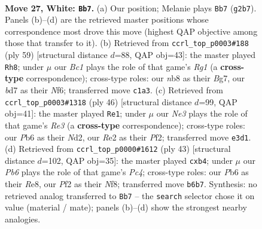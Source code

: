 \documentclass[11pt]{article}
\begin{document}
\clearpage

\begin{figure}[p]\centering
\begin{subfigure}{0.46\textwidth}\centering
\resizebox{\linewidth}{!}{%
\newchessgame
\chessboard[
  setfen={1n3r1k/3b2b1/rP3n2/p3p3/P1P3p1/4N1P1/3NRPB1/1RB3K1 w - - 1 27},
  showmover=false,
  pgfstyle=straightmove, color=movearrow, markmove={g2-b7}
]}
\caption{}
\end{subfigure}\hfill
\begin{subfigure}{0.46\textwidth}\centering
\resizebox{\linewidth}{!}{%
\newchessgame
\chessboard[
  setfen={6r1/1kp1r1b1/1p3n2/3Pn1p1/1PP3p1/4P3/1BK1B3/2N3RR b - - 0 30},
  showmover=false,
  pgfstyle=straightmove, color=movearrow, markmove={g8-h8}
]}
\caption{}
\end{subfigure}
\\[4pt]
\begin{subfigure}{0.46\textwidth}\centering
\resizebox{\linewidth}{!}{%
\newchessgame
\chessboard[
  setfen={4rbk1/1R2np2/4b1pp/p2r4/8/P3RNP1/1P1N1PBP/6K1 w - - 1 24},
  showmover=false,
  pgfstyle=straightmove, color=movearrow, markmove={e3-e1}
]}
\caption{}
\end{subfigure}\hfill
\begin{subfigure}{0.46\textwidth}\centering
\resizebox{\linewidth}{!}{%
\newchessgame
\chessboard[
  setfen={r3rnk1/pp1b2p1/1n3p2/2p4P/1P1p1N2/5N2/P1PB1PP1/2K1R2R b - - 0 22},
  showmover=false,
  pgfstyle=straightmove, color=movearrow, markmove={c5-b4}
]}
\caption{}
\end{subfigure}
\caption{\textbf{Move 27, White: \texttt{Bb7}.} (a) Our position; Melanie plays \texttt{Bb7} (\texttt{g2b7}). Panels (b)--(d) are the retrieved master positions whose correspondence most drove this move (highest QAP objective among those that transfer to it). (b) Retrieved from \texttt{ccrl\_top\_p0003\#188} (ply 59) [structural distance $d$=88, QAP obj=43]: the master played \texttt{Rh8}; under $\mu$ our \emph{Bc1} plays the role of that game's \emph{Rg1} (a \textbf{cross-type} correspondence); cross-type roles: our \emph{n}b8 as their \emph{B}g7, our \emph{b}d7 as their \emph{N}f6; transferred move \texttt{c1a3}. (c) Retrieved from \texttt{ccrl\_top\_p0003\#1318} (ply 46) [structural distance $d$=99, QAP obj=41]: the master played \texttt{Re1}; under $\mu$ our \emph{Ne3} plays the role of that game's \emph{Re3} (a \textbf{cross-type} correspondence); cross-type roles: our \emph{P}b6 as their \emph{N}d2, our \emph{R}e2 as their \emph{P}f2; transferred move \texttt{e3d1}. (d) Retrieved from \texttt{ccrl\_top\_p0000\#1612} (ply 43) [structural distance $d$=102, QAP obj=35]: the master played \texttt{cxb4}; under $\mu$ our \emph{Pb6} plays the role of that game's \emph{Pc4}; cross-type roles: our \emph{P}b6 as their \emph{R}e8, our \emph{P}f2 as their \emph{N}f8; transferred move \texttt{b6b7}. Synthesis: no retrieved analog transferred to \texttt{Bb7} -- the \texttt{search} selector chose it on value (material / mate); panels (b)--(d) show the strongest nearby analogies.}
\label{fig:thought-m52}
\end{figure}
\end{document}

